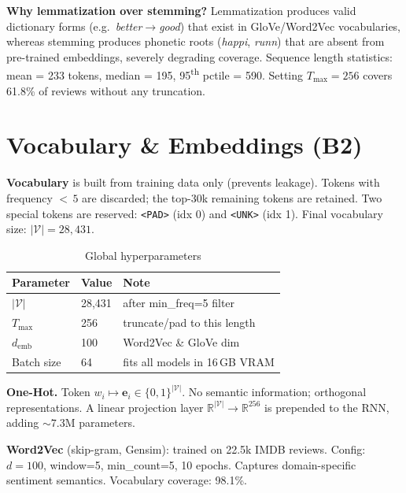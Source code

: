 \documentclass[10pt,a4paper,twocolumn]{article}
\begin{document}
\textbf{Why lemmatization over stemming?} Lemmatization produces valid
dictionary forms (e.g.\ \textit{better}$\to$\textit{good}) that exist in
GloVe/Word2Vec vocabularies, whereas stemming produces phonetic roots
(\textit{happi}, \textit{runn}) that are absent from pre-trained embeddings,
severely degrading coverage. Sequence length statistics: mean = 233 tokens,
median = 195, 95\textsuperscript{th} pctile = 590.
Setting $T_{\max}=256$ covers 61.8\% of reviews without any truncation.

\section{Vocabulary \& Embeddings (B2)}

\textbf{Vocabulary} is built from training data only (prevents leakage).
Tokens with frequency ${<}\,5$ are discarded; the top-30k remaining tokens
are retained. Two special tokens are reserved:
\texttt{<PAD>} (idx 0) and \texttt{<UNK>} (idx 1).
Final vocabulary size: $|\mathcal{V}|=28{,}431$.

\begin{table}[H]
\centering\small
\caption{Global hyperparameters}
\begin{tabular}{lll}
\toprule
Parameter & Value & Note\\
\midrule
$|\mathcal{V}|$ & 28,431 & after min\_freq=5 filter\\
$T_{\max}$      & 256    & truncate/pad to this length\\
$d_{\text{emb}}$& 100    & Word2Vec \& GloVe dim\\
Batch size      & 64     & fits all models in 16\,GB VRAM\\
\bottomrule
\end{tabular}
\label{tab:hyperparam}
\end{table}

\textbf{One-Hot.}
Token $w_i \mapsto \mathbf{e}_i\!\in\!\{0,1\}^{|\mathcal{V}|}$. No semantic
information; orthogonal representations. A linear projection layer
$\mathbb{R}^{|\mathcal{V}|}\!\to\!\mathbb{R}^{256}$ is prepended to the RNN,
adding ${\sim}7.3$M parameters.

\textbf{Word2Vec} (skip-gram, Gensim): trained on 22.5k IMDB reviews.
Config: $d=100$, window=5, min\_count=5, 10 epochs. Captures domain-specific
sentiment semantics. Vocabulary coverage: 98.1\%.
\end{document}
